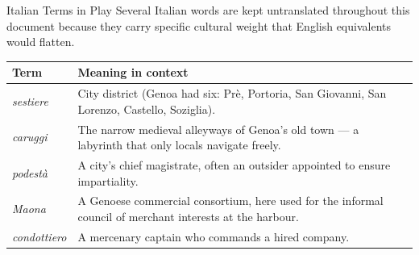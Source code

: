\begin{rulebox}[SharedBrown]{Italian Terms in Play}
Several Italian words are kept untranslated throughout this document because
they carry specific cultural weight that English equivalents would flatten.

\begin{center}
\begin{tabular}{L{3cm} p{9.5cm}}
  \toprule
  \textbf{Term} & \textbf{Meaning in context} \\
  \midrule
  \textit{sestiere}   & City district (Genoa had six: Prè, Portoria, San Giovanni,
                        San Lorenzo, Castello, Soziglia). \\
  \textit{caruggi}    & The narrow medieval alleyways of Genoa's old town ---
                        a labyrinth that only locals navigate freely. \\
  \textit{podestà}    & A city's chief magistrate, often an outsider appointed
                        to ensure impartiality. \\
  \textit{Maona}      & A Genoese commercial consortium, here used for the
                        informal council of merchant interests at the harbour. \\
  \textit{condottiero}& A mercenary captain who commands a hired company. \\
  \bottomrule
\end{tabular}
\end{center}
\end{rulebox}
